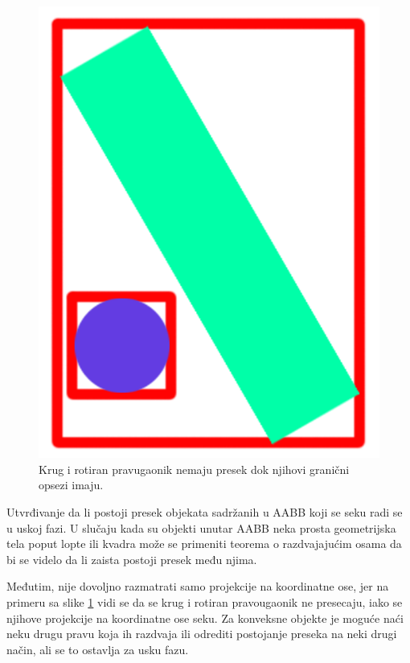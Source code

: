 \documentclass[12pt,oneside]{memoir}
\begin{document}
\begin{figure}[h!]
	\centering
	\includegraphics[scale=0.2]{2dfalseCol.png}
	\caption{Krug i rotiran pravugaonik nemaju presek dok njihovi granični opsezi imaju.}
	\label{fig:2dfalse}
\end{figure}

Utvrđivanje da li postoji presek objekata sadržanih u AABB koji se seku radi se u uskoj fazi.
U slučaju kada su objekti unutar AABB neka prosta geometrijska tela poput
lopte ili kvadra može se primeniti teorema o razdvajajućim osama da bi se videlo da li zaista postoji presek među njima. 


Međutim, nije dovoljno razmatrati samo projekcije na koordinatne ose, 
jer na primeru sa slike \ref{fig:2dfalse} vidi se da se krug i rotiran pravougaonik ne presecaju, iako se njihove projekcije 
na koordinatne ose seku. Za konveksne objekte je moguće naći neku drugu pravu koja ih razdvaja ili odrediti postojanje preseka 
na neki drugi način, ali se to ostavlja za usku fazu.
\end{document}
